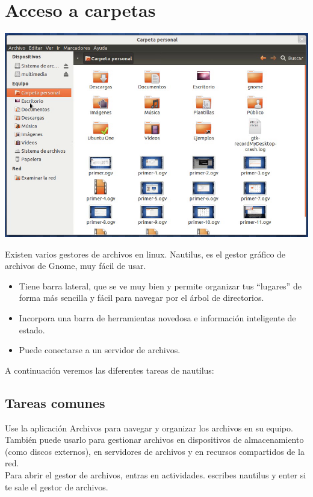 \chapter{Acceso a carpetas}
\begin{center}
\includegraphics[scale=0.6]{img/carpetass.png}
\end{center}
Existen varios gestores de archivos en linux.
Nautilus, es el gestor gráfico de archivos de Gnome, muy fácil de usar.
\begin{itemize}
\item Tiene barra lateral, que se ve muy bien y permite organizar tus “lugares” de forma más sencilla y fácil para navegar por el árbol de directorios.
\item Incorpora una barra de herramientas novedosa e información inteligente de estado.
\item Puede conectarse a un servidor de archivos.
\end{itemize}
A continuación veremos las diferentes tareas de nautilus:
\section{Tareas comunes}
Use la aplicación Archivos para navegar y organizar los archivos en su equipo. También puede usarlo para gestionar archivos en dispositivos de almacenamiento (como discos externos), en servidores de archivos y en recursos compartidos de la red.\\
Para abrir el gestor de archivos, entras en actividades. escribes nautilus y enter si te sale el gestor de archivos.
